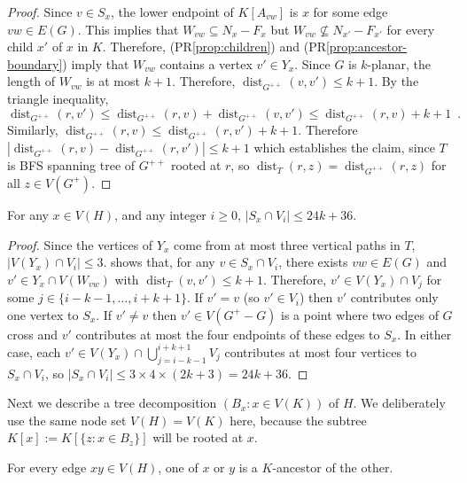 \documentclass{patmorin}
\DeclareMathOperator{\dist}{dist}
\renewcommand{\propref}[1]{(PR\ref{prop:#1})}
\begin{document}
\begin{proof}
  Since $v\in S_x$, the lower endpoint of $K[A_{vw}]$ is $x$ for some edge $vw\in E(G)$.  This implies that $W_{vw}\subseteq N_x-F_x$ but $W_{vw} \not\subseteq N_{x'}-F_{x'}$ for every child $x'$ of $x$ in $K$. Therefore, \propref{children} and \propref{ancestor-boundary} imply that $W_{vw}$ contains a vertex $v'\in Y_x$.  Since $G$ is $k$-planar, the length of $W_{vw}$ is at most $k+1$.  Therefore, $\dist_{G^{++}}(v,v') \le k+1$.
  By the triangle inequality,     
  \[
    \dist_{G^{++}}(r,v') \le \dist_{G^{++}}(r,v) + \dist_{G^{++}}(v,v') 
       \le \dist_{G^{++}}(r,v) + k + 1 \enspace .
  \]
  Similarly, $\dist_{G^{++}}(r,v) \le \dist_{G^{++}}(r, v') + k+1$.  Therefore
  $|\dist_{G^{++}}(r,v)-\dist_{G^{++}}(r,v')| \le k+1$ which establishes the claim, since $T$ is BFS spanning tree of $G^{++}$ rooted at $r$, so $\dist_{T}(r,z)=\dist_{G^{++}}(r,z)$ for all $z\in V(G^+)$.
\end{proof}

\begin{clm}
  For any $x\in V(H)$, and any integer $i\ge 0$, $|S_x\cap V_i|\le 24k+36$.
\end{clm}

\begin{proof}
  Since the vertices of $Y_x$ come from at most three vertical paths in $T$, $|V(Y_x)\cap V_i|\le 3$.   shows that, for any $v\in S_x\cap V_i$, there exists $vw\in E(G)$ and $v'\in Y_x\cap V(W_{vw})$ with $\dist_T(v,v')\le k+1$. Therefore, $v'\in V(Y_x)\cap V_{j}$ for some $j\in\{i-k-1,\ldots,i+k+1\}$.  If $v'=v$ (so $v'\in V_i$) then $v'$ contributes only one vertex to $S_x$.  If $v'\neq v$ then $v'\in V(G^+-G)$ is a point where two edges of $G$ cross and $v'$ contributes at most the four endpoints of these edges to $S_x$. In either case, each $v'\in V(Y_x)\cap \bigcup_{j=i-k-1}^{i+k+1} V_j$ contributes at most four vertices to $S_x\cap V_i$, so $|S_x\cap V_i|\le 3\times 4\times (2k+3) = 24k+36$.
\end{proof}

Next we describe a tree decomposition $(B_x:x\in V(K))$ of $H$.  We deliberately use the same node set $V(H)=V(K)$ here, because the subtree $K[x]:=K[\{z:x\in B_z\}]$ will be rooted at $x$.  

\begin{clm}
   For every edge $xy\in V(H)$, one of $x$ or $y$ is a $K$-ancestor of the other.
 \end{clm}
 
\end{document}
